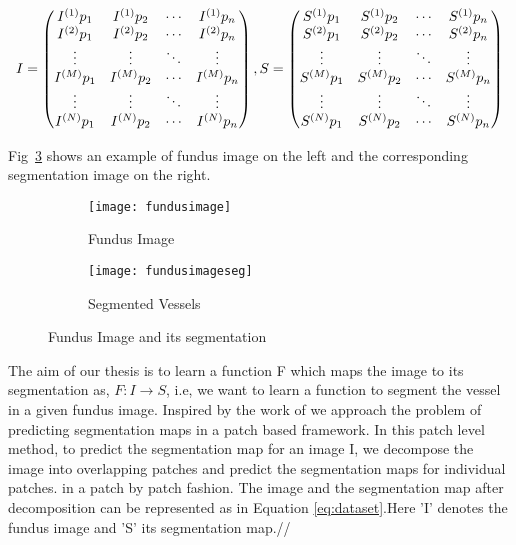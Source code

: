 \begin{equation}\label{eq:dataset}
I = 	
\begin{pmatrix}
I^{(1)}{p}_1 & I^{(1)}{p}_2 & \cdots & I^{(1)}{p}_n \\
I^{(2)}{p}_1 & I^{(2)}{p}_2 & \cdots & I^{(2)}{p}_n \\
\vdots  		  & \vdots  		  & \ddots & \vdots  \\
I^{(M)}{p}_1 & I^{(M)}{p}_2 & \cdots & I^{(M)}{p}_n \\
\vdots  		  & \vdots  		  & \ddots & \vdots  \\
I^{(N)}{p}_1 & I^{(N)}{p}_2 & \cdots & I^{(N)}{p}_n 
\end{pmatrix}
\\
,S = 	
\begin{pmatrix}
S^{(1)}{p}_1 & S^{(1)}{p}_2 & \cdots & S^{(1)}{p}_n \\
S^{(2)}{p}_1 & S^{(2)}{p}_2 & \cdots & S^{(2)}{p}_n \\
\vdots  		  & \vdots  		  & \ddots & \vdots  \\
S^{(M)}{p}_1 & S^{(M)}{p}_2 & \cdots & S^{(M)}{p}_n \\
\vdots  		  & \vdots  		  & \ddots & \vdots  \\
S^{(N)}{p}_1 & S^{(N)}{p}_2 & \cdots & S^{(N)}{p}_n 
\end{pmatrix}
\end{equation}



Fig~\ref{fig:fundus example} shows an example of fundus image on the left and the corresponding segmentation image on the right.\\

\begin{figure}
	\centering
	\begin{subfigure}[b]{0.45\textwidth}
		\centering
		\texttt{[image: fundusimage]}
		\caption{Fundus Image}
		\label{fig:fundusex}
	\end{subfigure}
	\hfill
	\begin{subfigure}[b]{0.45\textwidth}
		\centering
		\texttt{[image: fundusimageseg]}
		\caption{Segmented Vessels}
		\label{fig:fundusex seg}
	\end{subfigure}
	\caption{Fundus Image and its segmentation}
	\label{fig:fundus example}
\end{figure}

The aim of our thesis is to learn a function F which maps the image to its segmentation as, $ F: I \rightarrow S $, i.e, we want to learn a function to segment the vessel in a given fundus image. Inspired by the work of \cite{mnih2012learning,lim2013sketch} we approach the problem of predicting segmentation maps in a  patch based framework. In this patch level method, to predict the segmentation map for an image I, we decompose the image into overlapping patches and predict the segmentation maps for individual patches. in a patch by patch fashion. The image and the segmentation map after decomposition can be represented as in Equation \ref{eq:dataset}.Here 'I' denotes the fundus image and 'S' its segmentation map.//

